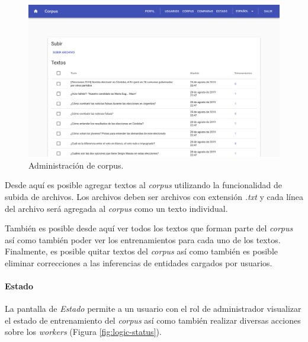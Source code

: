 \documentclass[12pt,a4paper,]{scrartcl}
\let\oldparagraph\paragraph
\renewcommand{\paragraph}[1]{\oldparagraph{#1}\mbox{}}
\begin{document}
\begin{figure}[H]

{\centering \includegraphics{assets/logic/corpus-management.pdf} 

}

\caption{Administración de corpus.}\label{fig:logic-corpus-management}
\end{figure}

Desde aquí es posible agregar textos al \emph{corpus} utilizando la funcionalidad de subida de archivos. Los archivos deben ser archivos con extensión \emph{.txt} y cada línea del archivo será agregada al \emph{corpus} como un texto individual.

También es posible desde aquí ver todos los textos que forman parte del \emph{corpus} así como también poder ver los entrenamientos para cada uno de los textos. Finalmente, es posible quitar textos del \emph{corpus} así como también es posible eliminar correcciones a las inferencias de entidades cargados por usuarios.

\hypertarget{estado}{%
\paragraph{Estado}\label{estado}}

La pantalla de \emph{Estado} permite a un usuario con el rol de administrador visualizar el estado de entrenamiento del \emph{corpus} así como también realizar diversas acciones sobre los \emph{workers} (Figura \ref{fig:logic-status}).
\end{document}
